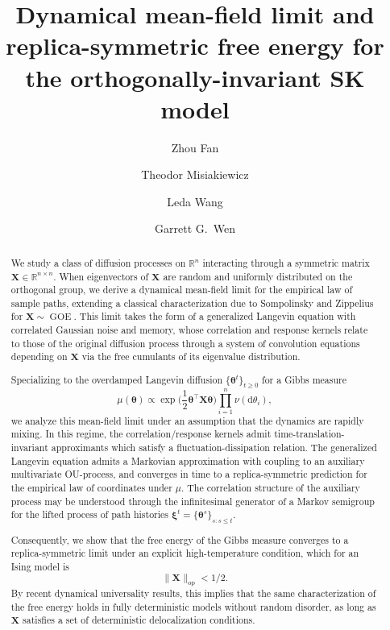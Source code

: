 \documentclass[11pt,letterpaper,reqno]{amsart}
\def\R{\mathbb{R}}
\def\d{\mathrm{d}}
\def\btheta{\boldsymbol{\theta}}
\def\bxi{\boldsymbol{\xi}}
\def\X{\mathbf{X}}
\def\GOE{\operatorname{GOE}}
\def\op{\mathrm{op}}
\theoremstyle{definition}
\numberwithin{equation}{section}
\begin{document}
\title[DMFT for the orthogonally-invariant SK model]{Dynamical mean-field limit and replica-symmetric free energy for the orthogonally-invariant SK model}

\author{Zhou Fan}
\author{Theodor Misiakiewicz}
\author{Leda Wang}
\author{Garrett G.\ Wen}
\address{Yale University, Department of Statistics and Data Science}
  

\begin{abstract}
We study a class of diffusion processes on $\R^n$ interacting through a
symmetric matrix $\X \in \R^{n \times n}$. When eigenvectors of
$\X$ are random and uniformly distributed on the orthogonal group, we derive a
dynamical mean-field limit for the empirical law of sample paths,
extending a classical characterization due to Sompolinsky and Zippelius for
$\X \sim \GOE$. This limit takes the form of a generalized Langevin equation
with correlated Gaussian noise and memory, whose correlation and response
kernels relate to those of the original diffusion process through a system of
convolution equations depending on $\X$ via the free cumulants of its eigenvalue
distribution.

Specializing to the overdamped Langevin diffusion $\{\btheta^t\}_{t \geq 0}$
for a Gibbs measure
\[\mu(\btheta) \propto \exp\Big(\frac{1}{2}\btheta^\top \X\btheta\Big)
\prod_{i=1}^n \nu(\d\theta_i),\]
we analyze this mean-field limit under an assumption that the dynamics are rapidly
mixing. In this regime, the correlation/response kernels admit
time-translation-invariant approximants which satisfy a
fluctuation-dissipation relation. The generalized Langevin equation admits a
Markovian approximation with coupling to an auxiliary multivariate OU-process,
and converges in time to a replica-symmetric prediction for the
empirical law of coordinates under $\mu$. The correlation structure of
the auxiliary process may be understood through the infinitesimal generator of a
Markov semigroup for the lifted process of path histories
$\bxi^t=\{\btheta^s\}_{s:s \leq t}$.

Consequently, we show that the free energy of the Gibbs measure
converges to a replica-symmetric limit under an explicit
high-temperature condition, which for an Ising model is
\[\|\X\|_\op<1/2.\]
By recent dynamical universality results, this implies that the same characterization of the free energy holds in fully deterministic models without random disorder, as long as
$\X$ satisfies a set of deterministic delocalization conditions.
\end{abstract}
\end{document}
